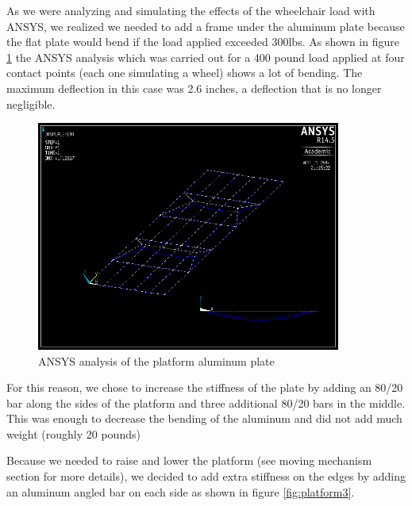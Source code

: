 As we were analyzing and simulating the effects of the wheelchair load with ANSYS, we realized we needed to add a frame under the aluminum plate because the flat plate would bend if the load applied exceeded 300lbs. As shown in figure \ref{fig:platform2} the ANSYS analysis which was carried out for a 400 pound load applied at four contact points (each one simulating a wheel) shows a lot of bending. The maximum deflection in this case was 2.6 inches, a deflection that is no longer negligible.
 
\begin{figure}[h]
\centering
\includegraphics[width=10cm]{images/platform2.png}
\caption{ANSYS analysis of the platform aluminum plate}
\label{fig:platform2}
\end{figure}
 
For this reason, we chose to increase the stiffness of the plate by adding an 80/20 bar along the sides of the platform and three additional 80/20 bars in the middle. This was enough to decrease the bending of the aluminum and did not add much weight (roughly 20 pounds)
 
Because we needed to raise and lower the platform (see moving mechanism section for more details), we decided to add extra stiffness on the edges by adding an aluminum angled bar on each side as shown in figure \ref{fig:platform3}.
 
